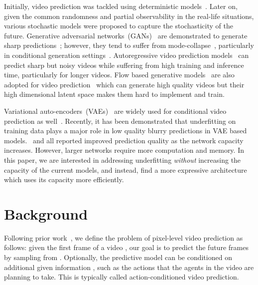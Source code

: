 \documentclass{article}
\begin{document}
Initially, video prediction was tackled using deterministic models~\cite{walker2015dense,finn2016unsupervised,jia2016dynamic,xue2016visual,walker2016uncertain,liang2017dual,byravan2017se3,vondrick2017generating,van2017transformation,liu2017video,chen2017video,lu2017flexible}. Later on, given the common randomness and partial observability in the real-life situations, various stochastic models were proposed to capture the stochasticity of the future. Generative adversarial networks~(GANs)~\cite{goodfellow2014generative} are demonstrated to generate sharp predictions~\cite{mathieu2015deep,lee2018stochastic,clark2019adversarial,luc2020transformation, hong2021arrowgan}; however, they tend to suffer from mode-collapse~\citep{goodfellow2016nips}, particularly in conditional generation settings~\citep{isola2016image}. Autoregressive video prediction models~\citep{kalchbrenner2016video,reed2017parallel,weissenborn2019scaling} can predict sharp but noisy videos while suffering from high training and inference time, particularly for longer videos. Flow based generative models~\cite{dinh2014nice, dinh2016density} are also adopted for video prediction~\cite{kumar2019videoflow} which can generate high quality videos but their high dimensional latent space makes them hard to implement and train. 

Variational auto-encoders~(VAEs)~\cite{kingma2013auto} are widely used for conditional video prediction as well~\cite{shu2016stochastic,babaeizadeh2017stochastic,denton2018stochastic,wichers2018hierarchical,villegas2019high,franceschi2020stochastic, castrejon2019improved,yan2021videogpt,rakhimov2020latent,lee2021revisiting,wu2021greedy,walker2021predicting}. Recently, it has been demonstrated that underfitting on training data plays a major role in low quality blurry predictions in VAE based models.~\citet{villegas2019high, castrejon2019improved} and \citet{wu2021greedy} all reported improved prediction quality as the network capacity increases. However, larger networks require more computation and memory. In this paper, we are interested in addressing underfitting \textit{without} increasing the capacity of the current models, and instead, find a more expressive architecture which uses its capacity more efficiently.

\section{Background}
Following prior work~\cite{finn2016unsupervised, babaeizadeh2017stochastic, denton2018stochastic, rubinstein1997optimization, oprea2020review, wu2021greedy}, we define the problem of pixel-level video prediction as follows: given the first  frame of a video , our goal is to predict the future frames by sampling from . Optionally, the predictive model can be conditioned on additional given information , such as the actions that the agents in the video are planning to take. This is typically called action-conditioned video prediction.
\end{document}
